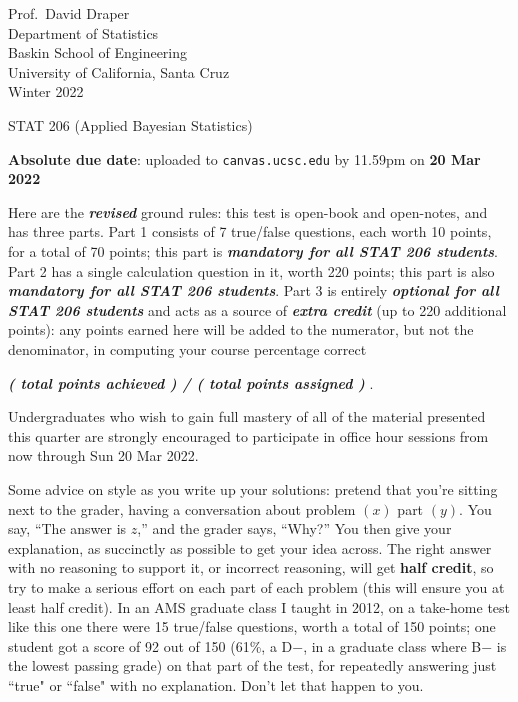 \documentclass[12pt]{article}
\newcommand{\bi}[1]{\textbf{\textit{#1}}}
\begin{document}
\begin{flushleft}

Prof.~David Draper \\
Department of Statistics \\
Baskin School of Engineering \\
University of California, Santa Cruz \\
Winter 2022

\end{flushleft}

\Large

\begin{center}

STAT 206 (\textsf{Applied Bayesian Statistics})


\large

\textbf{Absolute due date}: uploaded to \texttt{canvas.ucsc.edu} by 11.59pm on \textbf{20 Mar 2022}

\end{center}

\normalsize

Here are the \bi{revised} ground rules: this test is open-book and open-notes, and has three parts. Part 1 consists of 7 true/false questions, each worth 10 points, for a total of 70 points; this part is \bi{mandatory for all STAT 206 students}. Part 2 has a single calculation question in it, worth 220 points; this part is also \bi{mandatory for all STAT 206 students}. Part 3 is entirely \bi{optional for all STAT 206 students} and acts as a source of \bi{extra credit} (up to 220 additional points): any points earned here will be added to the numerator, but not the denominator, in computing your course percentage correct 

\hspace*{0.5in}\bi{( total points achieved ) / ( total points assigned )} .

Undergraduates who wish to gain full mastery of all of the material presented this quarter are strongly encouraged to participate in office hour sessions from now through Sun 20 Mar 2022.

Some advice on style as you write up your solutions: pretend that you're sitting next to the grader, having a conversation about problem $( x )$ part $( y )$. You say, ``The answer is $z$,'' and the grader says, ``Why?'' You then give your explanation, as succinctly as possible to get your idea across. The right answer with no reasoning to support it, or incorrect reasoning, will get \textbf{half credit}, so try to make a serious effort on each part of each problem (this will ensure you at least half credit). In an AMS graduate class I taught in 2012, on a take-home test like this one there were 15 true/false questions, worth a total of 150 points; one student got a score of 92 out of 150 (61\%, a D$-$, in a graduate class where B$-$ is the lowest passing grade) on that part of the test, for repeatedly answering just ``true" or ``false" with no explanation. Don't let that happen to you.  
\end{document}
